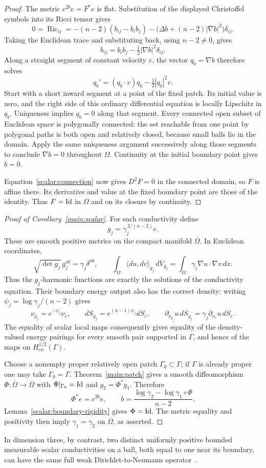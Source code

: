 \begin{proof}
The metric $e^{2b}e=F^*e$ is flat.  Substitution of the displayed
Christoffel symbols into its Ricci tensor gives
\[
 0=\operatorname{Ric}_{ij}
 =-(n-2)(b_{ij}-b_i b_j)
   -\bigl(\Delta b+(n-2)|\nabla b|^2\bigr)\delta_{ij}.
\]
Taking the Euclidean trace and substituting back, using $n-2\ne0$,
gives
\begin{equation}\label{scalar:hessian}
 b_{ij}=b_i b_j-\tfrac12|\nabla b|^2\delta_{ij}.
\end{equation}
Along a straight segment of constant velocity $v$, the vector
$q_b=\nabla b$ therefore solves
\[
 q_b'=(q_b\cdot v)q_b-\tfrac12|q_b|^2v.
\]
Start with a short inward segment at a point of the fixed patch.
Its initial value is zero, and the right side of this ordinary
differential equation is locally Lipschitz in $q_b$.  Uniqueness
implies $q_b=0$ along that segment.  Every connected open subset of
Euclidean space is polygonally connected: the set reachable from one
point by polygonal paths is both open and relatively closed, because
small balls lie in the domain.  Apply the same uniqueness argument
successively along those segments to conclude $\nabla b=0$ throughout
$\Omega$.  Continuity at the initial boundary point gives $b=0$.

Equation~\eqref{scalar:connection} now gives $D^2F=0$ in the connected
domain, so $F$ is affine there.  Its derivative and value at the fixed
boundary point are those of the identity.  Thus $F=\mathrm{Id}$ in $\Omega$
and on its closure by continuity.
\end{proof}

\begin{proof}[Proof of Corollary~\ref{main:scalar}]
For each conductivity define
\[
 g_j=\gamma_j^{\,2/(n-2)}e.
\]
These are smooth positive metrics on the compact manifold
$\overline\Omega$.  In Euclidean coordinates,
\begin{equation}\label{scalar:energy-conversion}
 \sqrt{\det g_j}\,g_j^{ab}=\gamma_j\delta^{ab},\qquad
 \int_\Omega\langle du,dv\rangle_{g_j}\,dV_{g_j}
       =\int_\Omega\gamma_j\nabla u\cdot\nabla v\,dx.
\end{equation}
Thus the $g_j$-harmonic functions are exactly the solutions of the
conductivity equation.  Their boundary energy output also has the
correct density: writing $\psi_j=\log\gamma_j/(n-2)$ gives
\[
 \nu_{g_j}=e^{-\psi_j}\nu_e,\qquad
 dS_{g_j}=e^{(n-1)\psi_j}dS_e,\qquad
 \partial_{\nu_{g_j}}u\,dS_{g_j}
       =\gamma_j\partial_{\nu_e}u\,dS_e.
\]
The equality of scalar local maps consequently gives equality of
the density-valued energy pairings for every smooth pair supported
in $\Gamma$, and hence of the maps on $H^{1/2}_{co}(\Gamma)$.

Choose a nonempty proper relatively open patch
$\Gamma_0\subset\Gamma$; if $\Gamma$ is already proper one may
take $\Gamma_0=\Gamma$.  Theorem~\ref{main:patch} gives a smooth
diffeomorphism $\Phi:\overline\Omega\to\overline\Omega$ with
$\Phi|_{\Gamma_0}=\mathrm{Id}$ and $g_2=\Phi^*g_1$.  Therefore
\[
 \Phi^*e=e^{2b}e,\qquad
 b=\frac{\log\gamma_2-\log\gamma_1\circ\Phi}{n-2}.
\]
Lemma~\ref{scalar:boundary-rigidity} gives $\Phi=\mathrm{Id}$.
The metric equality and positivity then imply
$\gamma_1=\gamma_2$ on $\overline\Omega$, as asserted.
\end{proof}

In dimension three, by contrast, two distinct uniformly positive bounded
measurable scalar conductivities on a ball, both equal to one near its
boundary, can have the same full weak Dirichlet-to-Neumann
operator~\cite[Theorem~1.1]{OpenAIRoughScalar2026}.
